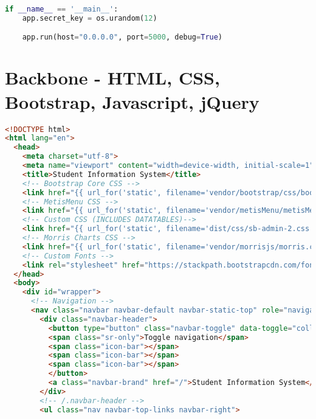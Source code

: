 \begin{lstlisting}[language=python]
if __name__ == '__main__':
    app.secret_key = os.urandom(12)

    app.run(host="0.0.0.0", port=5000, debug=True)

\end{lstlisting}

\section{Backbone - HTML, CSS, Bootstrap, Javascript, jQuery}

\begin{lstlisting}[language=HTML]
<!DOCTYPE html>
<html lang="en">
  <head>
    <meta charset="utf-8">
    <meta name="viewport" content="width=device-width, initial-scale=1">
    <title>Student Information System</title>
    <!-- Bootstrap Core CSS -->
    <link href="{{ url_for('static', filename='vendor/bootstrap/css/bootstrap.min.css') }}" rel="stylesheet">
    <!-- MetisMenu CSS -->
    <link href="{{ url_for('static', filename='vendor/metisMenu/metisMenu.min.css') }}" rel="stylesheet">
    <!-- Custom CSS (INCLUDES DATATABLES)-->
    <link href="{{ url_for('static', filename='dist/css/sb-admin-2.css') }}" rel="stylesheet">
    <!-- Morris Charts CSS -->
    <link href="{{ url_for('static', filename='vendor/morrisjs/morris.css') }}" rel="stylesheet">
    <!-- Custom Fonts -->
    <link rel="stylesheet" href="https://stackpath.bootstrapcdn.com/font-awesome/4.7.0/css/font-awesome.min.css">
  </head>
  <body>
    <div id="wrapper">
      <!-- Navigation -->
      <nav class="navbar navbar-default navbar-static-top" role="navigation" style="margin-bottom: 0">
        <div class="navbar-header">
          <button type="button" class="navbar-toggle" data-toggle="collapse" data-target=".navbar-collapse">
          <span class="sr-only">Toggle navigation</span>
          <span class="icon-bar"></span>
          <span class="icon-bar"></span>
          <span class="icon-bar"></span>
          </button>
          <a class="navbar-brand" href="/">Student Information System</a>
        </div>
        <!-- /.navbar-header -->
        <ul class="nav navbar-top-links navbar-right">
          

\end{lstlisting}
